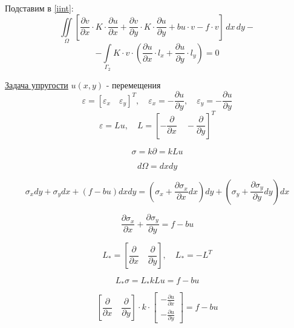 \documentclass{bmstu}
\begin{document}
	Подставим в \eqref{iint}:
	\[\iint\limits_{\Omega} \left [ \frac{\partial v}{\partial x} \cdot K \cdot \frac{\partial u}{\partial x} + \frac{\partial v}{\partial y} \cdot K \cdot \frac{\partial u}{\partial y} + bu \cdot v - f  \cdot v \right ] \, dx \, dy -\]
	\[-\int \limits_{\Gamma_2} K \cdot v \cdot \left(\frac{\partial u}{\partial x} \cdot l_x + \frac{\partial u}{\partial y} \cdot l_y \right) = 0\]

	\underline{Задача упругости}
 	$ u(x, y) $ - перемещения \\
 	\[ \varepsilon = [\varepsilon_x \quad \varepsilon_y]^T, \quad \varepsilon_x = - \frac{\partial u}{\partial y},\quad \varepsilon_y = - \frac{\partial u}{\partial y} \]
	\[ \varepsilon = Lu,\quad L = \left[- \frac{\partial}{\partial x} \quad - \frac{\partial}{\partial y}\right]^T \]

	\[ \sigma = k \partial = kLu \]

	\[ d \Omega = dxdy \]

	\[ \sigma_x dy + \sigma_y dx + (f-bu) dxdy = \left(\sigma_x + \frac{\partial \sigma_x}{\partial x}dx\right) dy + \left(\sigma_y + \frac{\partial \sigma_y}{\partial y}dy\right) dx \]

	\[ \frac{\partial \sigma_x}{\partial x} + \frac{\partial \sigma_y}{\partial y} = f - bu \]

	\[ L_* = \left[\frac{\partial}{\partial x} \quad \frac{\partial}{\partial y}\right],\quad L_* = -L^T \]

	\[ L_* \sigma = L_*kLu = f - bu \]

	\[ \left[\frac{\partial}{\partial x} \quad \frac{\partial}{\partial y}\right] \cdot k \cdot 
	\begin{bmatrix}
		-\frac{\partial u}{\partial x}\\
		- \frac{\partial u}{\partial y}
	\end{bmatrix}
 	= f-bu \]
	
	
	
	
	
	
	
	
	
	
	
	
	
	
	
	
	
	
	
	
	
	   
\end{document}
